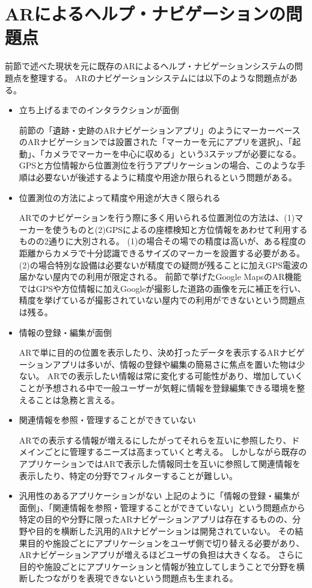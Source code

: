 \section{ARによるヘルプ・ナビゲーションの問題点}
\label{problems}
前節で述べた現状を元に既存のARによるヘルプ・ナビゲーションシステムの問題点を整理する。
ARのナビゲーションシステムには以下のような問題点がある。

\begin{itemize}
  \item 立ち上げるまでのインタラクションが面倒
  
  前節の「遺跡・史跡のARナビゲーションアプリ」のようにマーカーベースのARナビゲーションでは設置された「マーカーを元にアプリを選択」、「起動」、「カメラでマーカーを中心に収める」という3ステップが必要になる。
  GPSと方位情報から位置測位を行うアプリケーションの場合、このような手順は必要ないが後述するように精度や用途か限られるという問題がある。
  
  \item 位置測位の方法によって精度や用途が大きく限られる
  
  ARでのナビゲーションを行う際に多く用いられる位置測位の方法は、(1)マーカーを使うものと(2)GPSによるの座標検知と方位情報をあわせて利用するものの2通りに大別される。
  (1)の場合その場での精度は高いが、ある程度の距離からカメラで十分認識できるサイズのマーカーを設置する必要がある。
  (2)の場合特別な設備は必要ないが精度での疑問が残ることに加えGPS電波の届かない屋内での利用が限定される。
  前節で挙げたGoogle MapsのAR機能ではGPSや方位情報に加えGoogleが撮影した道路の画像を元に補正を行い、精度を挙げているが撮影されていない屋内での利用ができないという問題点は残る。

  \item 情報の登録・編集が面倒
  
  ARで単に目的の位置を表示したり、決め打ったデータを表示するARナビゲーションアプリは多いが、情報の登録や編集の簡易さに焦点を置いた物は少ない。
  ARでの表示したい情報は常に変化する可能性があり、増加していくことが予想される中で一般ユーザーが気軽に情報を登録編集できる環境を整えることは急務と言える。

  \item 関連情報を参照・管理することができていない
  
  ARでの表示する情報が増えるにしたがってそれらを互いに参照したり、ドメインごとに管理するニーズは高まっていくと考える。
  しかしながら既存のアプリケーションではARで表示した情報同士を互いに参照して関連情報を表示したり、特定の分野でフィルターすることが難しい。

  \item 汎用性のあるアプリケーションがない
  上記のように「情報の登録・編集が面倒」、「関連情報を参照・管理することができていない」という問題点から特定の目的や分野に限ったARナビゲーションアプリは存在するものの、分野や目的を横断した汎用的ARナビゲーションは開発されていない。
  その結果目的や施設ごとにアプリケーションをユーザ側で切り替える必要があり、ARナビゲーションアプリが増えるほどユーザの負担は大きくなる。
  さらに目的や施設ごとにアプリケーションと情報が独立してしまうことで分野を横断したつながりを表現できないという問題点も生まれる。

\end{itemize}



